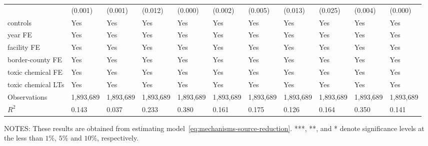 \begin{table}[H]
{\begin{tabular}{@{}lllllllllll@{}}
            & (0.001)       & (0.001)       & (0.012)        & (0.000)      & (0.002)        & (0.005)   & (0.013)                      & (0.025)          & (0.004)               & (0.000)          \\
            controls           & Yes           & Yes           & Yes            & Yes          & Yes            & Yes       & Yes                          & Yes              & Yes                   & Yes              \\
            year FE            & Yes           & Yes           & Yes            & Yes          & Yes            & Yes       & Yes                          & Yes              & Yes                   & Yes              \\
            facility FE        & Yes           & Yes           & Yes            & Yes          & Yes            & Yes       & Yes                          & Yes              & Yes                   & Yes              \\
            border-county FE   & Yes           & Yes           & Yes            & Yes          & Yes            & Yes       & Yes                          & Yes              & Yes                   & Yes              \\
            toxic chemical FE  & Yes           & Yes           & Yes            & Yes          & Yes            & Yes       & Yes                          & Yes              & Yes                   & Yes              \\
            toxic chemical LTs & Yes           & Yes           & Yes            & Yes          & Yes            & Yes       & Yes                          & Yes              & Yes                   & Yes              \\\midrule
            Observations       & 1,893,689     & 1,893,689     & 1,893,689      & 1,893,689    & 1,893,689      & 1,893,689 & 1,893,689                    & 1,893,689        & 1,893,689             & 1,893,689        \\
            $R^2$              & 0.143         & 0.037         & 0.233          & 0.380        & 0.161          & 0.175     & 0.126                        & 0.164            & 0.350                 & 0.141            \\ \bottomrule \bottomrule
        \end{tabular}%
    }
    \begin{minipage}{14cm}
        \vspace{0.05in}
        NOTES: These results are obtained from estimating model~\ref{eq:mechanisms-source-reduction}. ***, **, and * denote significance levels at the less than $1\%$, $5\%$ and $10\%$, respectively.
    \end{minipage}
\end{table}